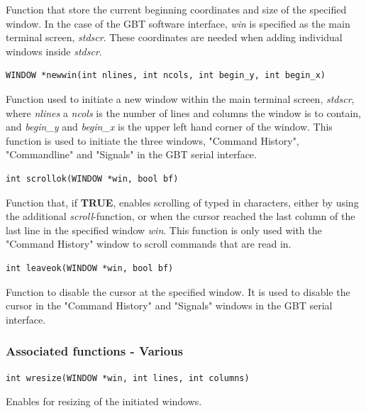 \documentclass[main.tex]{subfiles}
\begin{document}
Function that store the current beginning coordinates and size of the specified window. In the case of the GBT software interface, \textit{win} is specified as the main terminal screen, \textit{stdscr}. These coordinates are needed when adding individual windows inside \textit{stdscr}. \\

\begin{lstlisting}[frame=single] 
WINDOW *newwin(int nlines, int ncols, int begin_y, int begin_x)
\end{lstlisting}

Function used to initiate a new window within the main terminal screen, \textit{stdscr}, where \textit{nlines} a \textit{ncols} is the number of lines and columns the window is to contain, and \textit{begin\_y} and \textit{begin\_x} is the upper left hand corner of the window. This function is used to initiate the three windows, "Command History", "Commandline" and "Signals" in the GBT serial interface.\\

\begin{lstlisting}[frame=single] 
int scrollok(WINDOW *win, bool bf)
\end{lstlisting}

Function that, if \textbf{TRUE}, enables scrolling of typed in characters, either by using the additional \textit{scroll}-function, or when the cursor reached the last column of the last line in the specified window \textit{win}. This function is only used with the "Command History" window to scroll commands that are read in.\\

\begin{lstlisting}[frame=single] 
int leaveok(WINDOW *win, bool bf)
\end{lstlisting}

Function to disable the cursor at the specified window. It is used to disable the cursor in the "Command History" and "Signals" windows in the GBT serial interface.  

\subsubsection{Associated functions - Various}

\begin{lstlisting}[frame=single] 
int wresize(WINDOW *win, int lines, int columns)
\end{lstlisting}

Enables for resizing of the initiated windows. \\
\end{document}
